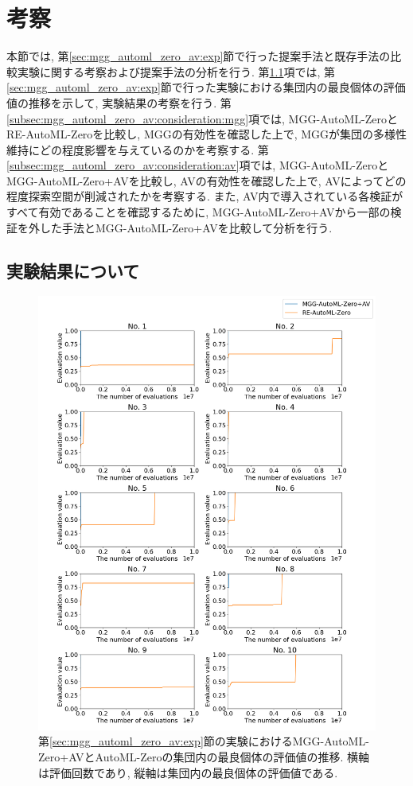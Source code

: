 \documentclass[11pt,oneside,openany,report]{jsbook}
\begin{document}
\section{考察}\label{sec:mgg_automl_zero_av:consideration}

本節では, 第\ref{sec:mgg_automl_zero_av:exp}節で行った提案手法と既存手法の比較実験に関する考察および提案手法の分析を行う. 第\ref{subsec:mgg_automl_zero_av:consideration:exp}項では, 第\ref{sec:mgg_automl_zero_av:exp}節で行った実験における集団内の最良個体の評価値の推移を示して, 実験結果の考察を行う. 第\ref{subsec:mgg_automl_zero_av:consideration:mgg}項では, MGG-AutoML-ZeroとRE-AutoML-Zeroを比較し, MGGの有効性を確認した上で, MGGが集団の多様性維持にどの程度影響を与えているのかを考察する. 第\ref{subsec:mgg_automl_zero_av:consideration:av}項では, MGG-AutoML-ZeroとMGG-AutoML-Zero+AVを比較し, AVの有効性を確認した上で, AVによってどの程度探索空間が削減されたかを考察する. また, AV内で導入されている各検証がすべて有効であることを確認するために, MGG-AutoML-Zero+AVから一部の検証を外した手法とMGG-AutoML-Zero+AVを比較して分析を行う.

\subsection{実験結果について}\label{subsec:mgg_automl_zero_av:consideration:exp}

\begin{figure}[tbp]
  \centering
  \includegraphics[width=14cm]{fitness_re_vs_mgg_av.png}
  \caption{第\ref{sec:mgg_automl_zero_av:exp}節の実験におけるMGG-AutoML-Zero+AVとAutoML-Zeroの集団内の最良個体の評価値の推移. 横軸は評価回数であり, 縦軸は集団内の最良個体の評価値である. }
  \label{fig:fitness_re_vs_mgg_av}
\end{figure}
\end{document}
